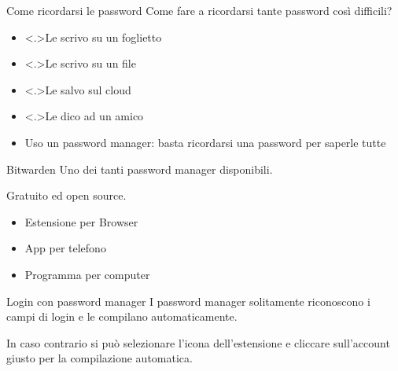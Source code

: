 \begin{myframe}{Come ricordarsi le password}
  Come fare a ricordarsi tante password così difficili?
  \pause
  \begin{itemize}[<+->]
    \item \stafter<.>{Le scrivo su un foglietto}
    \item \stafter<.>{Le scrivo su un file}
    \item \stafter<.>{Le salvo sul cloud}
    \item \stafter<.>{Le dico ad un amico}
    \item Uso un password manager: basta ricordarsi una password per saperle tutte
  \end{itemize}
\end{myframe}

\begin{myframe}{Bitwarden}
  Uno dei tanti password manager disponibili.

  \medskip\pause
  Gratuito ed open source.

  \medskip\pause
  \begin{itemize}
    \item Estensione per Browser
    \item App per telefono
    \item Programma per computer
  \end{itemize}
\end{myframe}

\begin{myframe}{Login con password manager}
  I password manager solitamente riconoscono i campi di login e le compilano automaticamente.

  \medskip\pause
  In caso contrario si può selezionare l'icona dell'estensione e cliccare sull'account giusto per la compilazione automatica.

\end{myframe}

